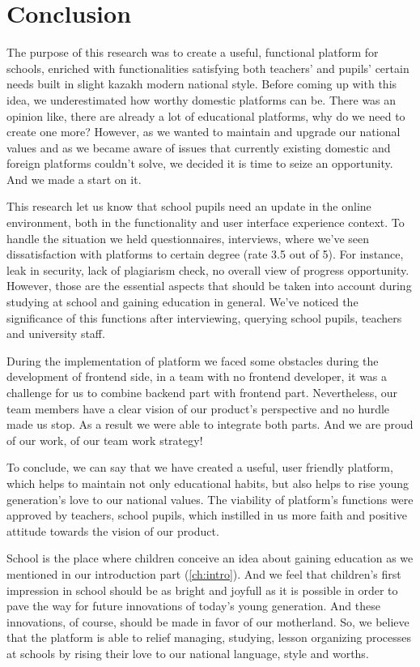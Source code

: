 \chapter{Conclusion}\label{ch:concl}
The purpose of this research was to create a useful, functional platform for schools, enriched with functionalities satisfying both teachers' and pupils' certain needs built in slight kazakh modern national style. Before coming up with this idea, we underestimated how worthy domestic platforms can be. There was an opinion like, there are already a lot of educational platforms, why do we need to create one more? However, as we wanted to maintain and upgrade our national values and as we became aware of issues that currently existing domestic and foreign platforms couldn't solve, we decided it is time to seize an opportunity. And we made a start on it. 

This research let us know that school pupils need an update in the online environment, both in the functionality and user interface experience context. To handle the situation we held questionnaires, interviews, where we've seen dissatisfaction with platforms to certain degree (rate 3.5 out of 5). For instance, leak in security, lack of plagiarism check, no overall view of progress opportunity. However, those are the essential aspects that should be taken into account during studying at school and gaining education in general. We've noticed the significance of this functions after interviewing, querying school pupils, teachers and university staff. 

During the implementation of platform we faced some obstacles during the development of frontend side, in a team with no frontend developer, it was a  challenge for us to combine backend part with frontend part. Nevertheless, our team members have a clear vision of our product's perspective and no hurdle made us stop. As a result we were able to integrate both parts. And we are proud of our work, of our team work strategy!

To conclude, we can say that we have created a useful, user friendly platform, which helps to maintain not only educational habits, but also helps to rise young generation's love to our national values. The viability of platform's functions were approved by teachers, school pupils, which instilled in us more faith and positive attitude towards the vision of our product. 

School is the place where children conceive an idea about gaining education as we mentioned in our introduction part (\cref{ch:intro}). And we feel that children's first impression in school should be as bright and joyfull as it is possible in order to pave the way for future innovations of today's young generation. And these innovations, of course, should be made in favor of our motherland. So, we believe that the platform is able to relief managing, studying, lesson organizing processes at schools by rising their love to our national language, style and worths. 

